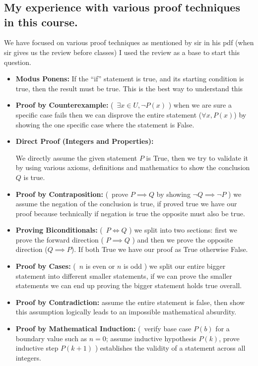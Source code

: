 \documentclass[11pt,a4paper]{article}
\renewcommand{\iff}{\Longleftrightarrow}
\theoremstyle{definition}
\begin{document}
\section{}

\subsection{My experience with various proof techniques in this course.}
We have focused on various proof techniques as mentioned by sir in his pdf (when sir gives us 
the review before classes) I used the review as a base to start this question.

\begin{itemize}
  \item \textbf{Modus Ponens:}
        If the ``if'' statement is true, and its starting condition is true, then the result must be true. This is the best way to understand this

  \item \textbf{Proof by Counterexample:}
        (\ $\exists x \in U, \neg P(x)$ )
        when we are sure a specific case fails then we can disprove the entire statement ($\forall x, P(x)$) by showing the one specific case where the statement is False.

  \item \textbf{Direct Proof (Integers and Properties):}
        
        We directly assume the given statement $P$ is True, then we try to validate it by using various axioms, definitions and mathematics to show the conclusion $Q$ is true.

  \item \textbf{Proof by Contraposition:}
        (\ prove $P \implies Q$ by showing $\neg Q \implies \neg P$ ) we assume the negation of the conclusion is true, if proved true we have our proof because technically if negation is true the opposite must also be true.

  \item \textbf{Proving Biconditionals:}
        (\ $P \iff Q$ ) we split into two sections: first we prove the forward direction ( $P \implies Q$ ) and then we prove the opposite direction ($Q \implies P$). If both True we have our proof as True otherwise False.

  \item \textbf{Proof by Cases:}
        (\ $n$ is even or $n$ is odd ) we split our entire bigger statement into different smaller statements, if we can prove the smaller statements we can end up proving the bigger statement holds true overall.

  \item \textbf{Proof by Contradiction:}
        assume the entire statement is false, then show this assumption logically leads to an impossible mathematical absurdity.

  \item \textbf{Proof by Mathematical Induction:}
        (\ verify base case $P(b)$ for a boundary value such as $n=0$; assume inductive hypothesis $P(k)$, prove inductive step $P(k+1)$ ) establishes the validity of a statement across all integers.
\end{itemize}
\end{document}
